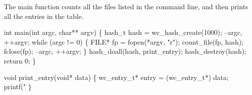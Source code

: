 The main function counts all the files listed in the command line,
and then prints all the entries in the table.

\nwenddocs{}\endmoddef
int main(int argc, char** argv)
\{
    hash_t hash = wc_hash_create(1000);
    --argc, ++argv;
    while (argc != 0) \{
        FILE* fp = fopen(*argv, "r");
        count_file(fp, hash);
        fclose(fp);
        --argc, ++argv;
    \}
    hash_doall(hash, print_entry);
    hash_destroy(hash);
    return 0;
\}

\nwendcode{}\nwdocspar

\nwenddocs{}\plusendmoddef
void print_entry(void* data)
\{
    wc_entry_t* entry = (wc_entry_t*) data;
    printf("%
\}

\nwendcode{}


